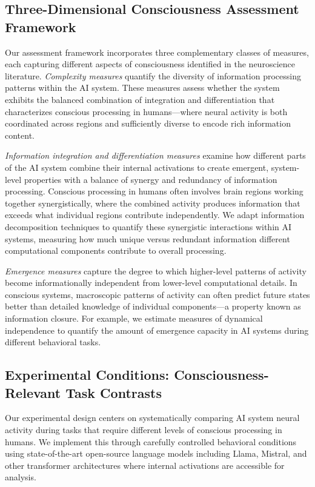 \documentclass[11pt,a4paper]{article}
\begin{document}
\subsection{Three-Dimensional Consciousness Assessment Framework}

Our assessment framework incorporates three complementary classes of measures, each capturing different aspects of consciousness identified in the neuroscience literature. \textit{Complexity measures} quantify the diversity of information processing patterns within the AI system. These measures assess whether the system exhibits the balanced combination of integration and differentiation that characterizes conscious processing in humans—where neural activity is both coordinated across regions and sufficiently diverse to encode rich information content.

\textit{Information integration and differentiation measures} examine how different parts of the AI system combine their internal activations to create emergent, system-level properties with a balance of synergy and redundancy of information processing. Conscious processing in humans often involves brain regions working together synergistically, where the combined activity produces information that exceeds what individual regions contribute independently. We adapt information decomposition techniques to quantify these synergistic interactions within AI systems, measuring how much unique versus redundant information different computational components contribute to overall processing.

\textit{Emergence measures} capture the degree to which higher-level patterns of activity become informationally independent from lower-level computational details. In conscious systems, macroscopic patterns of activity can often predict future states better than detailed knowledge of individual components—a property known as information closure. For example, we estimate measures of dynamical independence to quantify the amount of emergence capacity in AI systems during different behavioral tasks.
\subsection{Experimental Conditions: Consciousness-Relevant Task Contrasts}

Our experimental design centers on systematically comparing AI system neural activity during tasks that require different levels of conscious processing in humans. We implement this through carefully controlled behavioral conditions using state-of-the-art open-source language models including Llama, Mistral, and other transformer architectures where internal activations are accessible for analysis.
\end{document}

